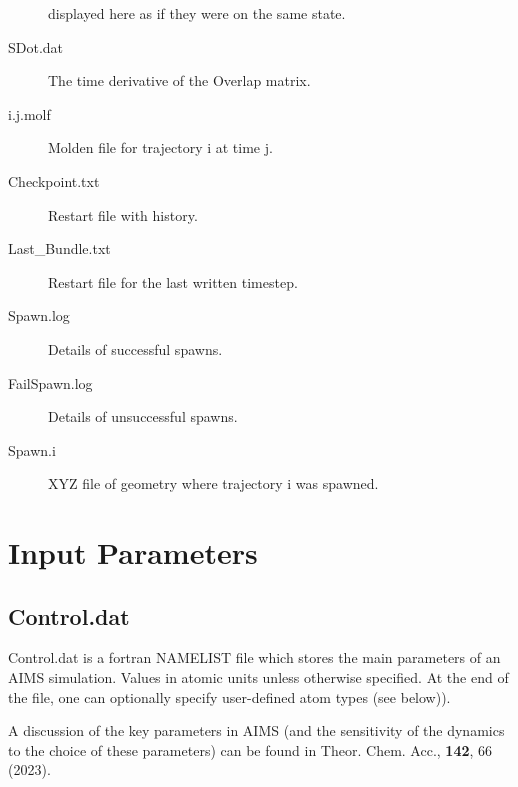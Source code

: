 \documentclass[11pt]{article}
\begin{document}
\begin{description}
displayed here as if they were on the same state.
\item[SDot.dat] The time derivative of the Overlap matrix.
\item[i.j.molf] Molden file for trajectory i at time j.
\item[Checkpoint.txt] Restart file with history.
\item[Last\_Bundle.txt] Restart file for the last written timestep.
\item[Spawn.log] Details of successful spawns.
\item[FailSpawn.log] Details of unsuccessful spawns.
\item[Spawn.i] XYZ file of geometry where trajectory i was spawned.
\end{description}




\newpage \section{Input Parameters}
\label{params} 


\subsection{Control.dat\label{controldat}}
Control.dat is a fortran NAMELIST file which stores the main parameters of an AIMS simulation. Values in 
atomic units unless otherwise specified. At the end of the file, one can optionally specify user-defined 
atom types (see below)).

A discussion of the key parameters in AIMS (and the sensitivity of the dynamics to the choice of these parameters) can be found in Theor. Chem. Acc., \textbf{142}, 66 (2023). 
\end{document}
